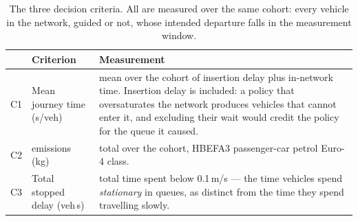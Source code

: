 \begin{table}[t]
\caption{The three decision criteria. All are measured over the same cohort:
every vehicle in the network, guided or not, whose intended departure falls in
the measurement window.}
\label{tab:criteria}
\centering\footnotesize
\begin{tabularx}{\textwidth}{@{}l l X@{}}
\toprule
& Criterion & Measurement\\
\midrule
C1 & Mean journey time (s/veh) &
  mean over the cohort of insertion delay plus in-network time. Insertion delay
  is included: a policy that oversaturates the network produces vehicles that
  cannot enter it, and excluding their wait would credit the policy for the
  queue it caused.\\[2pt]
C2 & \CO{} emissions (kg) &
  total \CO{} over the cohort, HBEFA3 passenger-car petrol Euro-4 class.\\[2pt]
C3 & Total stopped delay (veh\,s) &
  total time spent below 0.1\,m/s --- the time vehicles spend \emph{stationary}
  in queues, as distinct from the time they spend travelling slowly.\\
\bottomrule
\end{tabularx}
\end{table}